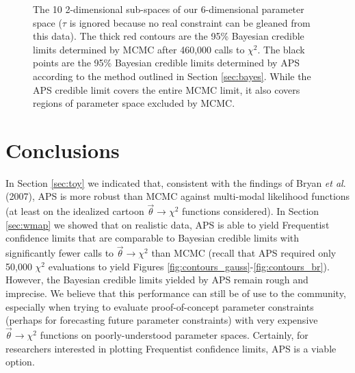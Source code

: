 \documentclass[useAMS,usenatbib]{aastex}
\begin{document}
\begin{figure*}
\caption{
The 10 2-dimensional sub-spaces of our 6-dimensional parameter space
($\tau$ is ignored because no real constraint can be gleaned from this data).
The thick red contours are the 95\% Bayesian credible limits determined by MCMC after
460,000 calls to $\chi^2$.  The black points are the 95\% Bayesian credible limits determined
by APS according to the method outlined in Section \ref{sec:bayes}.  While the APS credible limit
covers the entire MCMC limit, it also covers regions of parameter space excluded by MCMC.
}
\label{fig:contours_bayes}
\end{figure*}

\section{Conclusions}
\label{sec:conclusions}

In Section \ref{sec:toy} we indicated that, consistent with the findings
of Bryan {\it et al}. (2007), APS is more robust
than MCMC against multi-modal likelihood functions (at least on the idealized
cartoon $\vec{\theta}\rightarrow\chi^2$ functions considered).
In Section \ref{sec:wmap} we showed that on realistic data, APS
is able to yield Frequentist confidence limits that are comparable to
Bayesian credible limits with significantly fewer calls to $\vec{\theta}\rightarrow\chi^2$
than MCMC (recall that APS required only 50,000 $\chi^2$ evaluations to yield Figures
\ref{fig:contours_gauss}-\ref{fig:contours_br}).  However, the Bayesian credible
limits yielded by APS remain rough and imprecise.  We believe that this performance
can still be of use to the community, especially when trying to evaluate proof-of-concept
parameter constraints (perhaps for forecasting future parameter constraints)
with very expensive $\vec{\theta}\rightarrow\chi^2$ functions on poorly-understood
parameter spaces.  Certainly, for researchers interested in plotting Frequentist confidence limits,
APS is a viable option.
\end{document}
